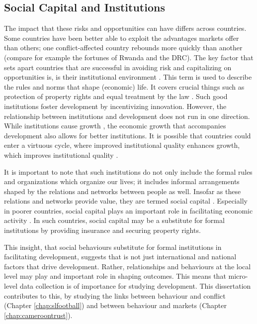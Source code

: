 \subsection{Social Capital and Institutions}
The impact that these risks and opportunities can have differs across countries. Some countries have been better able to exploit the advantages markets offer than others; one conflict-affected country rebounds more quickly than another (compare for example the fortunes of Rwanda and the DRC). The key factor that sets apart countries that are successful in avoiding risk and capitalizing on opportunities is, is their institutional environment \citep{Rodrik2004,Acemoglu2000}. This term is used to describe the rules and norms that shape (economic) life. It covers crucial things such as protection of property rights and equal treatment by the law \citep{Acemoglu2005}. Such good institutions  foster development by incentivizing innovation. However, the relationship between institutions and development does not run in one direction. While institutions cause growth \citep{Acemoglu2000}, the economic growth that accompanies development also allows for better institutions. It is possible that countries could enter a virtuous cycle, where improved institutional quality enhances growth, which improves institutional quality \citep{Voors2011}.

%
It is important to note that such institutions do not only include the formal rules and organizations which organize our lives; it includes informal arrangements shaped by the relations and networks between people as well. Insofar as these relations and networks provide value, they are termed social capital \citep[see for a more detailed discussion of the definition of the term][]{Putnam2001}. Especially in poorer countries, social capital plays an important role in facilitating economic activity \citep{Knack1997}. In such countries, social capital may be a substitute for formal institutions by providing insurance and securing property rights. 

This insight, that social behaviours substitute for formal institutions in facilitating development, suggests that is not just international and national factors that drive development. Rather, relationships and behaviours at the local level may play and important role in shaping outcomes. This means that micro-level data collection is of importance for studying development. This dissertation contributes to this, by studying the links between behaviour and conflict (Chapter \ref{chap:slfootball}) and between behaviour and markets (Chapter \ref{chap:cameroontrust}).

